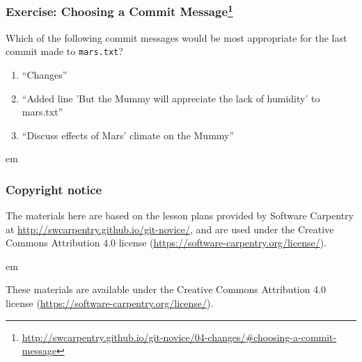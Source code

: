 \documentclass{beamer}
\newcommand{\correctans}{\textcolor{green!50!black}{\CheckmarkBold}}
\newcommand{\wrongans}{\textcolor{red!50!black}{\XSolidBold}}
\begin{document}
\begin{frame}
{\begin{minipage}{\textwidth}

  \end{minipage}
}
\end{frame}

\begin{frame}[fragile]
\frametitle{Exercise: Choosing a Commit Message\footnote{\url{http://swcarpentry.github.io/git-novice/04-changes/\#choosing-a-commit-message}}}

Which of the following commit messages would be most appropriate for the last commit made to \texttt{mars.txt}?

\begin{enumerate}
  \item ``Changes'' \onslide<2->{\wrongans}
  \item ``Added line 'But the Mummy will appreciate the lack of humidity' to mars.txt'' \onslide<2->{\wrongans}
  \item ``Discuss effects of Mars’ climate on the Mummy'' \onslide<2->{\correctans}
\end{enumerate}

 em


\end{frame}

\begin{frame}
\end{frame}

\begin{frame}
\frametitle{Copyright notice}

The materials here are based on the lesson plans provided by Software Carpentry at \url{http://swcarpentry.github.io/git-novice/}, and are used under the Creative Commons Attribution 4.0 license (\url{https://software-carpentry.org/license/}).

 em

These materials are available under the Creative Commons Attribution 4.0 license (\url{https://software-carpentry.org/license/}).

\end{frame}
\end{document}
